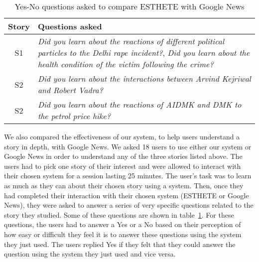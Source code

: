 \begin{table}
\small
\begin{tabular}{|c|p{7cm}|}
\hline
{\bf Story} & {\bf Questions asked}\\
\hline
S1 & {\em Did you learn about the reactions of different political particles to the Delhi rape incident?}, {\em Did you learn about the health condition of the victim following the crime?}\\
\hline
S2 & {\em Did you learn about the interactions between Arvind Kejriwal and Robert Vadra?}\\
\hline
S2 & {\em Did you learn about the reactions of AIDMK and DMK to the petrol price hike?}\\
\hline
\end{tabular}
\caption{Yes-No questions asked to compare ESTHETE with Google News}
\label{tab:domain-yes-no-questions}
\end{table}
We also compared the effectiveness of our system, to help users understand a story in depth, with Google News. We asked 18 users to use either our system or Google News in order to understand any of the three stories listed above. The users had to pick one story of their interest and were allowed to interact with their chosen system for a session lasting 25 minutes. The user's task was to learn as much as they can about their chosen story using a system. Then, once they had completed their
interaction with their chosen system (ESTHETE or Google News), they were asked to answer a series of very specific questions related to the story they studied. Some of these questions are shown in table~\ref{tab:domain-yes-no-questions}. For these questions, the users had to answer a Yes or a No based on their perception of how easy or difficult they feel it is to answer these questions using the system they just used. The users replied Yes if they felt that they could answer the question using the system they just used and vice versa.

